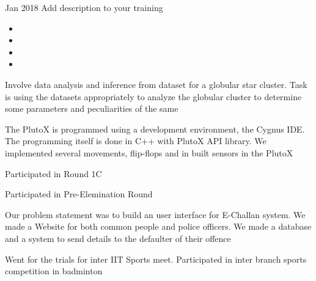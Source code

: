 {Jan 2018}
{Add description to your training}


\begin{itemize}
  \item {}
  \item{}
  \item{}
  \item{}
\end{itemize}

{Involve data analysis and inference from dataset for a globular star cluster. Task is using the datasets appropriately to analyze the globular cluster to determine some parameters and peculiarities of the same}
{}

{The PlutoX is programmed using a development environment, the Cygnus IDE. The programming itself is done in C++ with PlutoX API library. We implemented several movements, flip-flops and in built sensors in the PlutoX}
{}

{Participated in Round 1C}
{}

{Participated in Pre-Elemination Round}
{}

{Our problem statement was to build an user interface for E-Challan system. We made a Website for both common people and police officers. We made a database and a system to send details to the defaulter of their offence}
{}


{Went for the trials for inter IIT Sports meet. Participated in inter branch sports competition in badminton}


